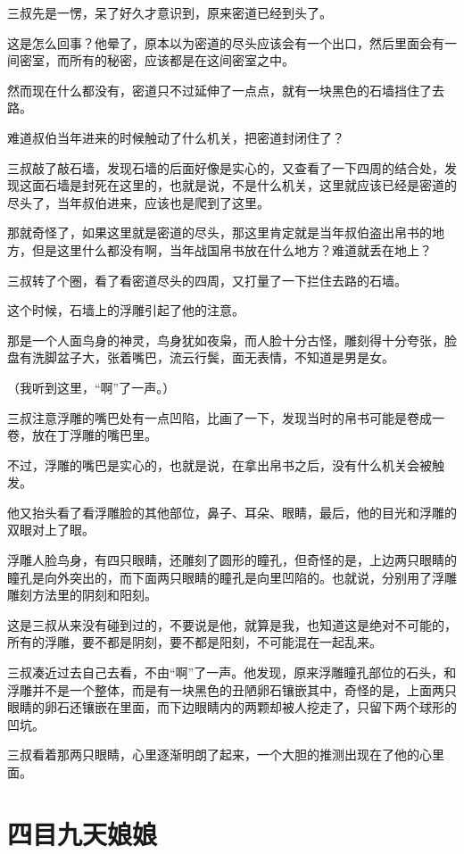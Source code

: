 三叔先是一愣，呆了好久才意识到，原来密道已经到头了。

这是怎么回事？他晕了，原本以为密道的尽头应该会有一个出口，然后里面会有一间密室，而所有的秘密，应该都是在这间密室之中。

然而现在什么都没有，密道只不过延伸了一点点，就有一块黑色的石墙挡住了去路。

难道叔伯当年进来的时候触动了什么机关，把密道封闭住了？

三叔敲了敲石墙，发现石墙的后面好像是实心的，又查看了一下四周的结合处，发现这面石墙是封死在这里的，也就是说，不是什么机关，这里就应该已经是密道的尽头了，当年叔伯进来，应该也是爬到了这里。

那就奇怪了，如果这里就是密道的尽头，那这里肯定就是当年叔伯盗出帛书的地方，但是这里什么都没有啊，当年战国帛书放在什么地方？难道就丢在地上？

三叔转了个圈，看了看密道尽头的四周，又打量了一下拦住去路的石墙。

这个时候，石墙上的浮雕引起了他的注意。

那是一个人面鸟身的神灵，鸟身犹如夜枭，而人脸十分古怪，雕刻得十分夸张，脸盘有洗脚盆子大，张着嘴巴，流云行鬓，面无表情，不知道是男是女。

（我听到这里，“啊”了一声。）

三叔注意浮雕的嘴巴处有一点凹陷，比画了一下，发现当时的帛书可能是卷成一卷，放在丁浮雕的嘴巴里。

不过，浮雕的嘴巴是实心的，也就是说，在拿出帛书之后，没有什么机关会被触发。

他又抬头看了看浮雕脸的其他部位，鼻子、耳朵、眼睛，最后，他的目光和浮雕的双眼对上了眼。

浮雕人脸鸟身，有四只眼睛，还雕刻了圆形的瞳孔，但奇怪的是，上边两只眼睛的瞳孔是向外突出的，而下面两只眼睛的瞳孔是向里凹陷的。也就说，分别用了浮雕雕刻方法里的阴刻和阳刻。

这是三叔从来没有碰到过的，不要说是他，就算是我，也知道这是绝对不可能的，所有的浮雕，要不都是阴刻，要不都是阳刻，不可能混在一起乱来。

三叔凑近过去自己去看，不由“啊”了一声。他发现，原来浮雕瞳孔部位的石头，和浮雕并不是一个整体，而是有一块黑色的丑陋卵石镶嵌其中，奇怪的是，上面两只眼睛的卵石还镶嵌在里面，而下边眼睛内的两颗却被人挖走了，只留下两个球形的凹坑。

三叔看着那两只眼睛，心里逐渐明朗了起来，一个大胆的推测出现在了他的心里面。

\chapter{四目九天娘娘}

